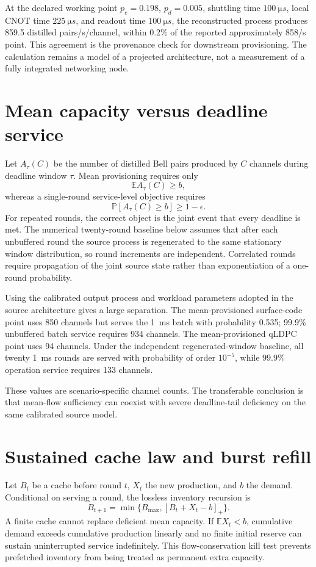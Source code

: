 \documentclass[aps,prx,reprint,superscriptaddress,nofootinbib,longbibliography,floatfix]{revtex4-2}
\newcommand{\E}{\mathbb E}\newcommand{\Prob}{\mathbb P}
\begin{document}
At the declared working point $p_e=0.198$, $p_d=0.005$, shuttling time $\SI{100}{\micro s}$, local CNOT time $\SI{225}{\micro s}$, and readout time $\SI{100}{\micro s}$, the reconstructed process produces 859.5 distilled pairs/s/channel, within 0.2\% of the reported approximately 858/s point. This agreement is the provenance check for downstream provisioning. The calculation remains a model of a projected architecture, not a measurement of a fully integrated networking node.

\section{Mean capacity versus deadline service}
Let $A_\tau(C)$ be the number of distilled Bell pairs produced by $C$ channels during deadline window $\tau$. Mean provisioning requires only
\begin{equation}
\E A_\tau(C)\ge b,
\end{equation}
whereas a single-round service-level objective requires
\begin{equation}
\Prob[A_\tau(C)\ge b]\ge1-\epsilon.
\label{eq:slo}
\end{equation}
For repeated rounds, the correct object is the joint event that every deadline is met. The numerical twenty-round baseline below assumes that after each unbuffered round the source process is regenerated to the same stationary window distribution, so round increments are independent. Correlated rounds require propagation of the joint source state rather than exponentiation of a one-round probability.

Using the calibrated output process and workload parameters adopted in the source architecture gives a large separation. The mean-provisioned surface-code point uses 850 channels but serves the \SI{1}{ms} batch with probability 0.535; 99.9\% unbuffered batch service requires 934 channels. The mean-provisioned qLDPC point uses 94 channels. Under the independent regenerated-window baseline, all twenty \SI{1}{ms} rounds are served with probability of order $10^{-5}$, while 99.9\% operation service requires 133 channels.

These values are scenario-specific channel counts. The transferable conclusion is that mean-flow sufficiency can coexist with severe deadline-tail deficiency on the same calibrated source model.

\section{Sustained cache law and burst refill}
Let $B_t$ be a cache before round $t$, $X_t$ the new production, and $b$ the demand. Conditional on serving a round, the lossless inventory recursion is
\begin{equation}
B_{t+1}=\min\{B_{\max},[B_t+X_t-b]_+\}.
\end{equation}
A finite cache cannot replace deficient mean capacity. If $\E X_t<b$, cumulative demand exceeds cumulative production linearly and no finite initial reserve can sustain uninterrupted service indefinitely. This flow-conservation kill test prevents prefetched inventory from being treated as permanent extra capacity.
\end{document}
